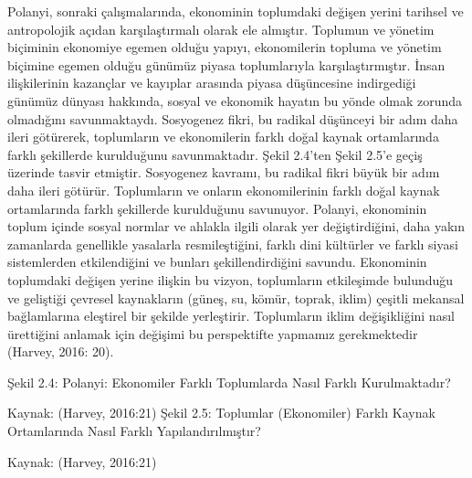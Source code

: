 \documentclass[
]{book}
\begin{document}
Polanyi, sonraki çalışmalarında, ekonominin toplumdaki değişen yerini tarihsel ve antropolojik açıdan karşılaştırmalı olarak ele almıştır. Toplumun ve yönetim biçiminin ekonomiye egemen olduğu yapıyı, ekonomilerin topluma ve yönetim biçimine egemen olduğu günümüz piyasa toplumlarıyla karşılaştırmıştır. İnsan ilişkilerinin kazançlar ve kayıplar arasında piyasa düşüncesine indirgediği günümüz dünyası hakkında, sosyal ve ekonomik hayatın bu yönde olmak zorunda olmadığını savunmaktaydı. Sosyogenez fikri, bu radikal düşünceyi bir adım daha ileri götürerek, toplumların ve ekonomilerin farklı doğal kaynak ortamlarında farklı şekillerde kurulduğunu savunmaktadır. Şekil 2.4'ten Şekil 2.5'e geçiş üzerinde tasvir etmiştir. Sosyogenez kavramı, bu radikal fikri büyük bir adım daha ileri götürür. Toplumların ve onların ekonomilerinin farklı doğal kaynak ortamlarında farklı şekillerde kurulduğunu savunuyor. Polanyi, ekonominin toplum içinde sosyal normlar ve ahlakla ilgili olarak yer değiştirdiğini, daha yakın zamanlarda genellikle yasalarla resmileştiğini, farklı dini kültürler ve farklı siyasi sistemlerden etkilendiğini ve bunları şekillendirdiğini savundu. Ekonominin toplumdaki değişen yerine ilişkin bu vizyon, toplumların etkileşimde bulunduğu ve geliştiği çevresel kaynakların (güneş, su, kömür, toprak, iklim) çeşitli mekansal bağlamlarına eleştirel bir şekilde yerleştirir. Toplumların iklim değişikliğini nasıl ürettiğini anlamak için değişimi bu perspektifte yapmamız gerekmektedir (Harvey, 2016: 20).

Şekil 2.4: Polanyi: Ekonomiler Farklı Toplumlarda Nasıl Farklı Kurulmaktadır?

Kaynak: (Harvey, 2016:21)
Şekil 2.5: Toplumlar (Ekonomiler) Farklı Kaynak Ortamlarında Nasıl Farklı Yapılandırılmıştır?

Kaynak: (Harvey, 2016:21)
\end{document}
